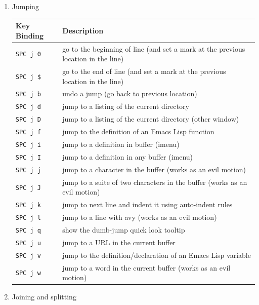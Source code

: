 \documentclass[11pt]{article}
\begin{document}
\begin{enumerate}
\item Jumping
\label{sec:org58b9cd3}

\begin{center}
\begin{tabular}{ll}
Key Binding & Description\\
\hline
\texttt{SPC j 0} & go to the beginning of line (and set a mark at the previous location in the line)\\
\texttt{SPC j \$} & go to the end of line (and set a mark at the previous location in the line)\\
\texttt{SPC j b} & undo a jump (go back to previous location)\\
\texttt{SPC j d} & jump to a listing of the current directory\\
\texttt{SPC j D} & jump to a listing of the current directory (other window)\\
\texttt{SPC j f} & jump to the definition of an Emacs Lisp function\\
\texttt{SPC j i} & jump to a definition in buffer (imenu)\\
\texttt{SPC j I} & jump to a definition in any buffer (imenu)\\
\texttt{SPC j j} & jump to a character in the buffer (works as an evil motion)\\
\texttt{SPC j J} & jump to a suite of two characters in the buffer (works as an evil motion)\\
\texttt{SPC j k} & jump to next line and indent it using auto-indent rules\\
\texttt{SPC j l} & jump to a line with avy (works as an evil motion)\\
\texttt{SPC j q} & show the dumb-jump quick look tooltip\\
\texttt{SPC j u} & jump to a URL in the current buffer\\
\texttt{SPC j v} & jump to the definition/declaration of an Emacs Lisp variable\\
\texttt{SPC j w} & jump to a word in the current buffer (works as an evil motion)\\
\end{tabular}
\end{center}

\item Joining and splitting
\label{sec:org20b4d0d}


\end{enumerate}
\end{document}
